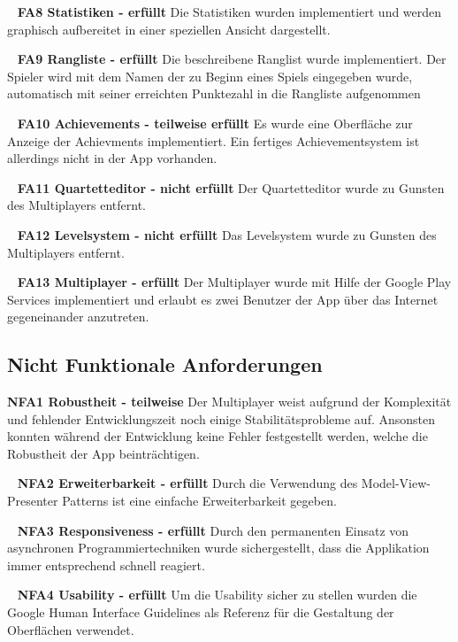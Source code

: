 \documentclass{scrartcl}
\begin{document}
\ \newline
\textbf{FA8 Statistiken - erfüllt} \newline
Die Statistiken wurden implementiert und werden graphisch aufbereitet in einer
speziellen Ansicht dargestellt.

\ \newline
\textbf{FA9 Rangliste - erfüllt} \newline
Die beschreibene Ranglist wurde implementiert. Der Spieler wird mit dem Namen
der zu Beginn eines Spiels eingegeben wurde, automatisch mit seiner erreichten
Punktezahl in die Rangliste aufgenommen

\ \newline
\textbf{FA10 Achievements - teilweise erfüllt} \newline
Es wurde eine Oberfläche zur Anzeige der Achievments implementiert. Ein fertiges
Achievementsystem ist allerdings nicht in der App vorhanden.

\ \newline
\textbf{FA11 Quartetteditor - nicht erfüllt} \newline
Der Quartetteditor wurde zu Gunsten des Multiplayers entfernt.

\ \newline
\textbf{FA12 Levelsystem - nicht erfüllt} \newline
Das Levelsystem wurde zu Gunsten des Multiplayers entfernt.

\ \newline
\textbf{FA13 Multiplayer - erfüllt} \newline
Der Multiplayer wurde mit Hilfe der Google Play Services implementiert und
erlaubt es zwei Benutzer der App über das Internet gegeneinander anzutreten.

\subsection{Nicht Funktionale Anforderungen}

\textbf{NFA1 Robustheit - teilweise} \newline
Der Multiplayer weist aufgrund der Komplexität und fehlender Entwicklungszeit
noch einige Stabilitätsprobleme auf. Ansonsten konnten während der Entwicklung
keine Fehler festgestellt werden, welche die Robustheit der App beinträchtigen.

\ \newline
\textbf{NFA2 Erweiterbarkeit - erfüllt} \newline
Durch die Verwendung des Model-View-Presenter Patterns ist eine einfache
Erweiterbarkeit gegeben.

\ \newline
\textbf{NFA3 Responsiveness - erfüllt} \newline
Durch den permanenten Einsatz von asynchronen Programmiertechniken wurde
sichergestellt, dass die Applikation immer entsprechend schnell reagiert.

\ \newline
\textbf{NFA4 Usability - erfüllt} \newline
Um die Usability sicher zu stellen wurden die Google Human Interface Guidelines
als Referenz für die Gestaltung der Oberflächen verwendet.
\end{document}
